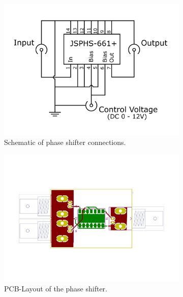 \begin{figure}[ht]
	\centering
	\begin{subfigure}{0.4\textwidth}
		\centering
		\includegraphics[width=\textwidth]{Chapters/Deflection/circuit_phase4zu3}
		\caption{Schematic of phase shifter connections.}
		\label{fig:circuit_phase}
	\end{subfigure}
	\hspace{0.1\textwidth}
	\begin{subfigure}{0.4\textwidth}
		\centering
		\includegraphics[width=\textwidth]{Chapters/Deflection/PCB_phase3}
		\caption{PCB-Layout of the phase shifter.}
		\label{fig:PCB_phase}
	\end{subfigure}
	\caption{}
	\label{fig:PhaseShifter}
\end{figure}





